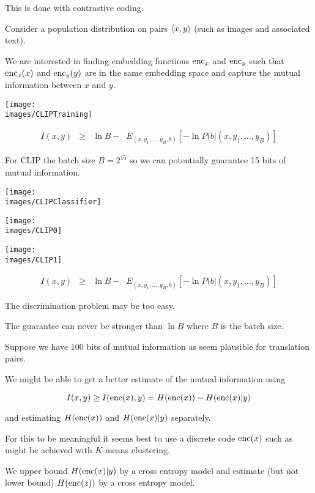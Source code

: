 {\vfill
This is done with contrastive coding.



Consider a population distribution on pairs ${\mbox{$\langle x,y\rangle$}}$ (such as images and associated text).

\vfill
We are interested in finding embedding functions $\mathrm{enc}_x$ and $\mathrm{enc}_y$ such that $\mathrm{enc}_x(x)$ and $\mathrm{enc}_y(y)$ are in the same embedding space
and capture the mutual information between $x$ and $y$.


\centerline{\texttt{[image: \\images/CLIPTraining]}}


\begin{eqnarray*}
I(x,y) & \geq & \ln B - \;\;E_{(x,y_1,\ldots,y_B,b)}\left[-\ln P(b|(x,y_1,\ldots,y_B)\right]
\end{eqnarray*}

\vfill
For CLIP the batch size $B = 2^{15}$ so we can potentially guarantee 15 bits of mutual information.


\centerline{\texttt{[image: \\images/CLIPClassifier]}}


\centerline{\texttt{[image: \\images/CLIP0]}}


\centerline{\texttt{[image: \\images/CLIP1]}}


{\huge
\begin{eqnarray*}
I(x,y) & \geq & \ln B - \;\;E_{(x,y_1,\ldots,y_B,b)}\left[-\ln P(b|(x,y_1,\ldots,y_B)\right]
\end{eqnarray*}
}

The discrimination problem may be too easy.

\vfill
The guarantee can never be stronger than $\ln B$ where $B$ is the batch size.

\vfill
Suppose we have 100 bits of mutual information as seem plausible for translation pairs.


We might be able to get a better estimate of the mutual information using

$$I(x,y) \geq I(\mathrm{enc}(x),y) = H(\mathrm{enc}(x)) - H(\mathrm{enc}(x)|y)$$

\vfill
and estimating $H(\mathrm{enc}(x))$ and $H(\mathrm{enc}(x)|y)$ separately.

\vfill
For this to be meaningful it seems best to use a discrete code $\mathrm{enc}(x)$ such as might be achieved with $K$-means clustering.

\vfill
We upper bound $H(\mathrm{enc}(x)|y)$ by a cross entropy model and estimate (but not lower bound) $H(\mathrm{enc}(z))$
by a cross entropy model.


}


